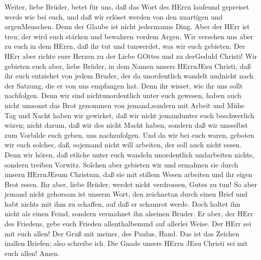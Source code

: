  Weiter, liebe Brüder, betet für uns, daß das Wort des HErrn
laufeund gepreiset werde wie bei euch,  und daß wir erlöset
werden von den unartigen und argenMenschen. Denn der Glaube ist nicht
jedermanns Ding.  Aber der HErr ist treu; der wird euch
stärken und bewahren vordem Argen.  Wir versehen uns aber zu
euch in dem HErrn, daß ihr tut und tunwerdet, was wir euch gebieten.
 Der HErr aber richte eure Herzen zu der Liebe GOttes und zu
derGeduld Christi!  Wir gebieten euch aber, liebe Brüder, in
dem Namen unsers HErrnJEsu Christi, daß ihr euch entziehet von jedem
Bruder, der da unordentlich wandelt undnicht nach der Satzung, die er
von uns empfangen hat.  Denn ihr wisset, wie ihr uns sollt
nachfolgen. Denn wir sind nichtunordentlich unter euch gewesen,
 haben auch nicht umsonst das Brot genommen von
jemand,sondern mit Arbeit und Mühe Tag und Nacht haben wir gewirket, daß
wir nicht jemandunter euch beschwerlich wären;  nicht darum,
daß wir des nicht Macht haben, sondern daß wir unsselbst zum Vorbilde
euch geben, uns nachzufolgen.  Und da wir bei euch waren,
geboten wir euch solches, daß, sojemand nicht will arbeiten, der soll
auch nicht essen.  Denn wir hören, daß etliche unter euch
wandeln unordentlich undarbeiten nichts, sondern treiben Vorwitz.
 Solchen aber gebieten wir und ermahnen sie durch unsern
HErrnJEsum Christum, daß sie mit stillem Wesen arbeiten und ihr eigen
Brot essen.  Ihr aber, liebe Brüder, werdet nicht
verdrossen, Gutes zu tun!  So aber jemand nicht gehorsam
ist unserm Wort, den zeichnetan durch einen Brief und habt nichts mit
ihm zu schaffen, auf daß er schamrot werde.  Doch haltet
ihn nicht als einen Feind, sondern vermahnet ihn alseinen Bruder.
 Er aber, der HErr des Friedens, gebe euch Frieden
allenthalbenund auf allerlei Weise. Der HErr sei mit euch allen!
 Der Gruß mit meiner, des Paulus, Hand. Das ist das Zeichen
inallen Briefen; also schreibe ich.  Die Gnade unsers HErrn
JEsu Christi sei mit euch allen! Amen.
